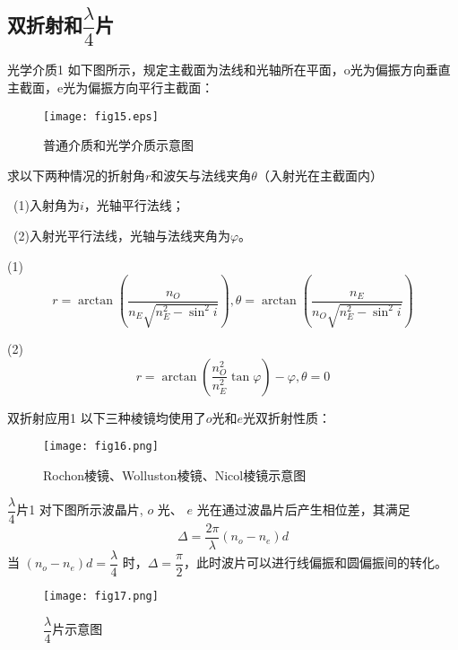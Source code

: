 \subsection{双折射和$\dfrac{\lambda}{4}$片}
\begin{myprop}{ 光学介质}{1}
	如下图所示，规定主截面为法线和光轴所在平面，o光为偏振方向垂直主截面，e光为偏振方向平行主截面：
\end{myprop}
\begin{figure}[!htp]
	\centering
	\texttt{[image: fig15.eps]}
	\caption{普通介质和光学介质示意图}
\end{figure}
\begin{example}
	求以下两种情况的折射角$r$和波矢与法线夹角$\theta$（入射光在主截面内）
	\par \ (1)入射角为$i$，光轴平行法线；
	\par \ (2)入射光平行法线，光轴与法线夹角为$\varphi$。
	\soln


	\par (1)
	\[
		r=\arctan \left(\dfrac{n_O}{n_E\sqrt{n_E^2-\sin ^2 i}}\right),\theta=\arctan \left(\dfrac{n_E}{n_O\sqrt{n_{E}^2-\sin ^2 i}}\right)
	\]
	\par (2)
	\[
		r=\arctan \left(\dfrac{n_{O}^2}{n_{E}^2}\tan \varphi\right)-\varphi,\theta=0
	\]
\end{example}
\begin{myprop}{ 双折射应用}{1}
	以下三种棱镜均使用了$o$光和$e$光双折射性质：
\end{myprop}
\begin{figure}[!htp]
	\centering
	\texttt{[image: fig16.png]}
	\caption{Rochon棱镜、Wolluston棱镜、Nicol棱镜示意图}
\end{figure}

\begin{myprop}{ $\dfrac{\lambda}{4}$片}{1}
	对下图所示波晶片, $o$ 光、 $e$ 光在通过波晶片后产生相位差，其满足
	\[
		\Delta=\frac{2 \pi}{\lambda}\left(n_o-n_e\right) d	
	\]
	当 $\left(n_o-n_e\right) d=\dfrac{\lambda}{4}$ 时，$\Delta=\dfrac{\pi}{2}$，此时波片可以进行线偏振和圆偏振间的转化。
\end{myprop}
\begin{figure}[!htp]
	\centering
	\texttt{[image: fig17.png]}
	\caption{$\dfrac{\lambda}{4}$片示意图}
\end{figure}

